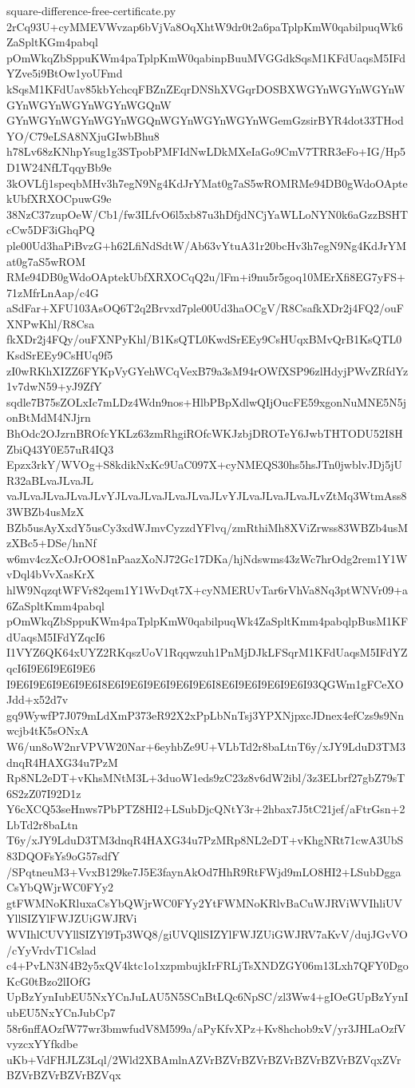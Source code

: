 \documentclass[11pt]{article}
\theoremstyle{definition}
\theoremstyle{remark}
\begin{document}
\begin{filecontents*}[overwrite]{square-difference-free-certificate.py}
2rCq93U+cyMMEVWvzap6bVjVa8OqXhtW9dr0t2a6paTplpKmW0qabilpuqWk6ZaSpltKGm4pabql
pOmWkqZbSppuKWm4paTplpKmW0qabinpBuuMVGGdkSqsM1KFdUaqsM5IFdYZve5i9BtOw1yoUFmd
kSqsM1KFdUav85kbYchcqFBZnZEqrDNShXVGqrDOSBXWGYnWGYnWGYnWGYnWGYnWGYnWGYnWGQnW
GYnWGYnWGYnWGYnWGQnWGYnWGYnWGYnWGemGzsirBYR4dot33THodYO/C79eLSA8NXjuGIwbBhu8
h78Lv68zKNhpYsug1g3STpobPMFIdNwLDkMXeIaGo9CmV7TRR3eFo+IG/Hp5D1W24NfLTqqyBb9e
3kOVLfj1speqbMHv3h7egN9Ng4KdJrYMat0g7aS5wROMRMe94DB0gWdoOAptekUbfXRXOCpuwG9e
38NzC37zupOeW/Cb1/fw3ILfvO6l5xb87u3hDfjdNCjYaWLLoNYN0k6aGzzBSHTcCw5DF3iGhqPQ
ple00Ud3haPiBvzG+h62LfiNdSdtW/Ab63vYtuA31r20bcHv3h7egN9Ng4KdJrYMat0g7aS5wROM
RMe94DB0gWdoOAptekUbfXRXOCqQ2u/lFm+i9nu5r5goq10MErXfi8EG7yFS+71zMfrLnAap/c4G
aSdFar+XFU103AsOQ6T2q2Brvxd7ple00Ud3haOCgV/R8CsafkXDr2j4FQ2/ouFXNPwKhl/R8Csa
fkXDr2j4FQy/ouFXNPyKhl/B1KsQTL0KwdSrEEy9CsHUqxBMvQrB1KsQTL0KsdSrEEy9CsHUq9f5
zI0wRKhXIZZ6FYKpVyGYehWCqVexB79a3sM94rOWfXSP96zlHdyjPWvZRfdYz1v7dwN59+yJ9ZfY
sqdle7B75sZOLxIc7mLDz4Wdn9nos+HlbPBpXdlwQIjOucFE59xgonNuMNE5N5jonBtMdM4NJjrn
BhOdc2OJzrnBROfcYKLz63zmRhgiROfcWKJzbjDROTeY6JwbTHTODU52I8HZbiQ43Y0E57uR4IQ3
Epzx3rkY/WVOg+S8kdikNxKc9UaC097X+cyNMEQS30hs5hsJTn0jwblvJDj5jUR32aBLvaJLvaJL
vaJLvaJLvaJLvaJLvYJLvaJLvaJLvaJLvaJLvYJLvaJLvaJLvaJLvZtMq3WtmAss83WBZb4usMzX
BZb5usAyXxdY5usCy3xdWJmvCyzzdYFlvq/zmRthiMh8XViZrwss83WBZb4usMzXBc5+DSe/hnNf
w6mv4czXcOJrOO81nPaazXoNJ72Gc17DKa/hjNdswms43zWc7hrOdg2rem1Y1WvDql4bVvXasKrX
hlW9NqzqtWFVr82qem1Y1WvDqt7X+cyNMERUvTar6rVhVa8Nq3ptWNVr09+a6ZaSpltKmm4pabql
pOmWkqZbSppuKWm4paTplpKmW0qabilpuqWk4ZaSpltKmm4pabqlpBusM1KFdUaqsM5IFdYZqcI6
I1VYZ6QK64xUYZ2RKqszUoV1Rqqwzuh1PnMjDJkLFSqrM1KFdUaqsM5IFdYZqcI6I9E6I9E6I9E6
I9E6I9E6I9E6I9E6I8E6I9E6I9E6I9E6I9E6I8E6I9E6I9E6I9E6I93QGWm1gFCeXOJdd+x52d7v
gq9WywfP7J079mLdXmP373eR92X2xPpLbNnTsj3YPXNjpxcJDnex4efCzs9s9Nnwcjb4tK5sONxA
W6/un8oW2nrVPVW20Nar+6eyhbZe9U+VLbTd2r8baLtnT6y/xJY9LduD3TM3dnqR4HAXG34u7PzM
Rp8NL2eDT+vKhsMNtM3L+3duoW1eds9zC23z8v6dW2ibl/3z3ELbrf27gbZ79sT6S2zZ07I92D1z
Y6cXCQ53seHnws7PbPTZ8HI2+LSubDjcQNtY3r+2hbax7J5tC21jef/aFtrGsn+2LbTd2r8baLtn
T6y/xJY9LduD3TM3dnqR4HAXG34u7PzMRp8NL2eDT+vKhgNRt71cwA3UbS83DQOFsYs9oG57sdfY
/SPqtneuM3+VvxB129ke7J5E3faynAkOd7HhR9RtFWjd9mLO8HI2+LSubDggaCsYbQWjrWC0FYy2
gtFWMNoKRluxaCsYbQWjrWC0FYy2YtFWMNoKRlvBaCuWJRViWVIhliUVYllSIZYlFWJZUiGWJRVi
WVIhlCUVYllSIZYl9Tp3WQ8/giUVQllSIZYlFWJZUiGWJRV7aKvV/dujJGvVO/cYyVrdvT1Cslad
c4+PvLN3N4B2y5xQV4ktc1o1xzpmbujkIrFRLjTsXNDZGY06m13Lxh7QFY0DgoKcG0tBzo2lIOfG
UpBzYynIubEU5NxYCnJuLAU5N5SCnBtLQc6NpSC/zl3Ww4+gIOeGUpBzYynIubEU5NxYCnJubCp7
58r6nffAOzfW77wr3bmwfudV8M599a/aPyKfvXPz+Kv8hchob9xV/yr3JHLaOzfVvyzcxYYfkdbe
uKb+VdFHJLZ3Lql/2Wld2XBAmlnAZVrBZVrBZVrBZVrBZVrBZVrBZVqxZVrBZVrBZVrBZVrBZVqx

\end{filecontents*}
\end{document}
